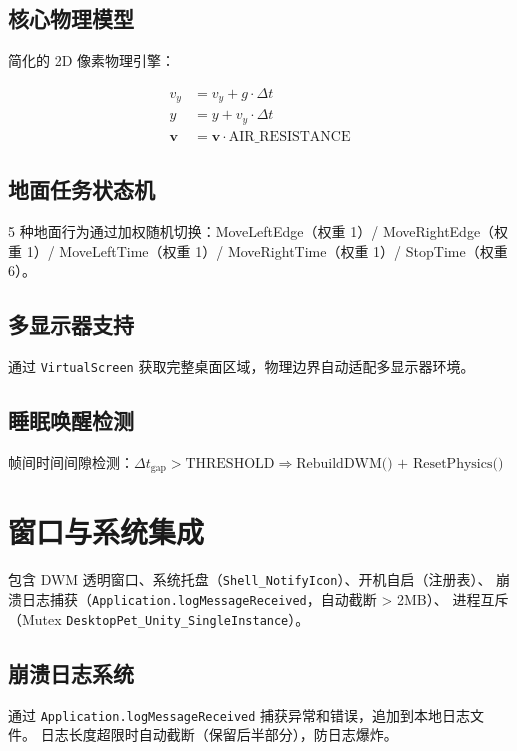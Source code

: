 \documentclass[12pt,a4paper]{ctexart}
\begin{document}
\subsection{核心物理模型}

简化的 2D 像素物理引擎：

\[
\begin{aligned}
v_y &= v_y + g \cdot \Delta t \\
y &= y + v_y \cdot \Delta t \\
\mathbf{v} &= \mathbf{v} \cdot \text{AIR\_RESISTANCE}
\end{aligned}
\]

\subsection{地面任务状态机}

5 种地面行为通过加权随机切换：MoveLeftEdge（权重 1）/ MoveRightEdge（权重 1）/
MoveLeftTime（权重 1）/ MoveRightTime（权重 1）/ StopTime（权重 6）。

\subsection{多显示器支持}

通过 \texttt{VirtualScreen} 获取完整桌面区域，物理边界自动适配多显示器环境。

\subsection{睡眠唤醒检测}

帧间时间间隙检测：$\Delta t_{\text{gap}} > \text{THRESHOLD} \Rightarrow \text{RebuildDWM() + ResetPhysics()}$

\section{窗口与系统集成}

包含 DWM 透明窗口、系统托盘（\texttt{Shell\_NotifyIcon}）、开机自启（注册表）、
崩溃日志捕获（\texttt{Application.logMessageReceived}，自动截断 > 2MB）、
进程互斥（Mutex \texttt{DesktopPet\_Unity\_SingleInstance}）。

\subsection{崩溃日志系统}

通过 \texttt{Application.logMessageReceived} 捕获异常和错误，追加到本地日志文件。
日志长度超限时自动截断（保留后半部分），防日志爆炸。
\end{document}

